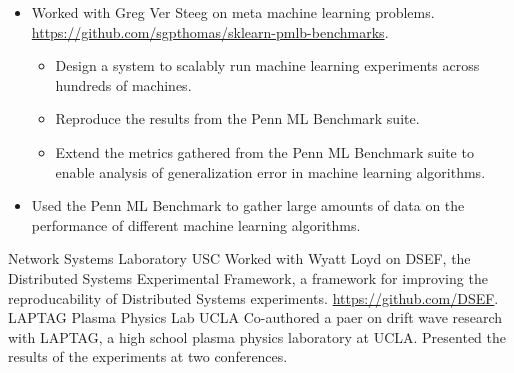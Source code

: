 \documentclass[10pt,a4paper,sans]{moderncv}        %
\begin{document}
{
  \begin{itemize}
  \item Worked with Greg Ver Steeg on meta machine learning problems.
    \url{https://github.com/sgpthomas/sklearn-pmlb-benchmarks}.
    \begin{itemize}
    \item Design a system to scalably run machine learning experiments across
      hundreds of machines.
    \item Reproduce the results from the Penn ML Benchmark suite.
    \item Extend the metrics gathered from the Penn ML Benchmark suite to enable
      analysis of generalization error in machine learning algorithms.
    \end{itemize}
  \item Used the Penn ML Benchmark to gather large amounts of data on the
    performance of different machine learning algorithms.
  \end{itemize}
}
%
{Network Systems Laboratory}
{USC}
{}
{}
{Worked with Wyatt Loyd on DSEF, the Distributed Systems Experimental Framework, a framework for
  improving the reproducability of Distributed Systems experiments.\newline
  \url{https://github.com/DSEF}.}
{LAPTAG Plasma Physics Lab}
{UCLA}
{}
{}
{
  Co-authored a paer on drift wave research with LAPTAG, a high school plasma
  physics laboratory at UCLA. Presented the results of the experiments at two conferences.
}
\end{document}
